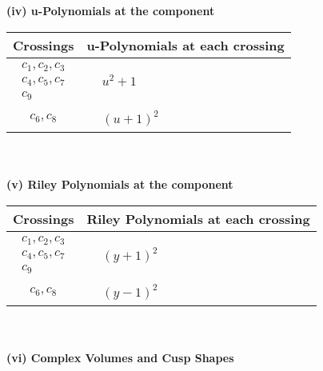 \documentclass[1p]{elsarticle_modified}
\theoremstyle{definition}
\begin{document}
\newpage\renewcommand{\arraystretch}{1}
\flushleft \textbf{(iv) u-Polynomials at the component}\newline \\
\begin{tabular}{m{50pt}|m{274pt}}
Crossings & \hspace{64pt}u-Polynomials at each crossing \\
\hline $$\begin{aligned}c_{1},c_{2},c_{3}\\c_{4},c_{5},c_{7}\\c_{9}\end{aligned}$$&$\begin{aligned}
&u^2+1
\end{aligned}$\\
\hline $$\begin{aligned}c_{6},c_{8}\end{aligned}$$&$\begin{aligned}
&(u+1)^2
\end{aligned}$\\
\hline
\end{tabular}\\~\\
\newpage\renewcommand{\arraystretch}{1}
\flushleft \textbf{(v) Riley Polynomials at the component}\newline \\
\begin{tabular}{m{50pt}|m{274pt}}
Crossings & \hspace{64pt}Riley Polynomials at each crossing \\
\hline $$\begin{aligned}c_{1},c_{2},c_{3}\\c_{4},c_{5},c_{7}\\c_{9}\end{aligned}$$&$\begin{aligned}
&(y+1)^2
\end{aligned}$\\
\hline $$\begin{aligned}c_{6},c_{8}\end{aligned}$$&$\begin{aligned}
&(y-1)^2
\end{aligned}$\\
\hline
\end{tabular}\\~\\
\newpage\flushleft \textbf{(vi) Complex Volumes and Cusp Shapes}
\end{document}
